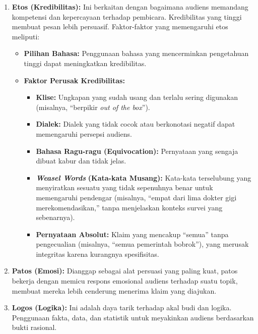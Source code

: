 \documentclass[
  letterpaper,
  DIV=11,
  numbers=noendperiod]{scrreprt}
\begin{document}
\begin{enumerate}
\def\labelenumi{\arabic{enumi}.}
\item
  \textbf{Etos (Kredibilitas):} Ini berkaitan dengan bagaimana audiens
  memandang kompetensi dan kepercayaan terhadap pembicara. Kredibilitas
  yang tinggi membuat pesan lebih persuasif. Faktor-faktor yang
  memengaruhi etos meliputi:

  \begin{itemize}
  \item
    \textbf{Pilihan Bahasa:} Penggunaan bahasa yang mencerminkan
    pengetahuan tinggi dapat meningkatkan kredibilitas.
  \item
    \textbf{Faktor Perusak Kredibilitas:}

    \begin{itemize}
    \item
      \textbf{Klise:} Ungkapan yang sudah usang dan terlalu sering
      digunakan (misalnya, ``berpikir \emph{out of the box}'').
    \item
      \textbf{Dialek:} Dialek yang tidak cocok atau berkonotasi negatif
      dapat memengaruhi persepsi audiens.
    \item
      \textbf{Bahasa Ragu-ragu (Equivocation):} Pernyataan yang sengaja
      dibuat kabur dan tidak jelas.
    \item
      \textbf{\emph{Weasel Words}} \textbf{(Kata-kata Musang):}
      Kata-kata terselubung yang menyiratkan sesuatu yang tidak
      sepenuhnya benar untuk memengaruhi pendengar (misalnya, ``empat
      dari lima dokter gigi merekomendasikan,'' tanpa menjelaskan
      konteks survei yang sebenarnya).
    \item
      \textbf{Pernyataan Absolut:} Klaim yang mencakup ``semua'' tanpa
      pengecualian (misalnya, ``semua pemerintah bobrok''), yang merusak
      integritas karena kurangnya spesifisitas.
    \end{itemize}
  \end{itemize}
\item
  \textbf{Patos (Emosi):} Dianggap sebagai alat persuasi yang paling
  kuat, patos bekerja dengan memicu respons emosional audiens terhadap
  suatu topik, membuat mereka lebih cenderung menerima klaim yang
  diajukan.
\item
  \textbf{Logos (Logika):} Ini adalah daya tarik terhadap akal budi dan
  logika. Penggunaan fakta, data, dan statistik untuk meyakinkan audiens
  berdasarkan bukti rasional.
\end{enumerate}
\end{document}
